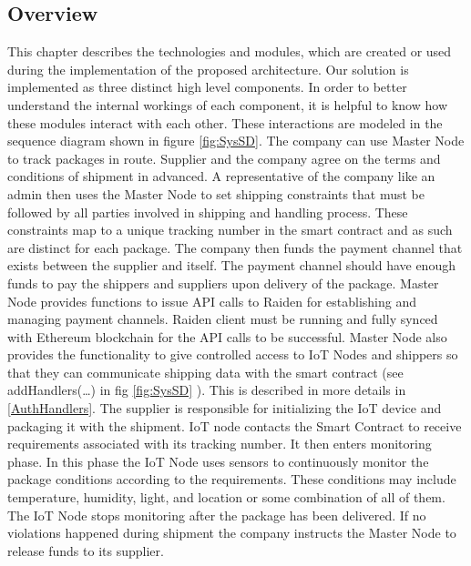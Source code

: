 \subsection{Overview}
This chapter describes the technologies and modules, which are created or used during the implementation of the proposed architecture. Our solution is implemented as three distinct high level components. In order to better understand the internal workings of each component, it is helpful to know how these modules interact with each other.  These interactions are modeled in the sequence diagram shown in figure \ref{fig:SysSD}.  The company can use Master Node to track packages in route. Supplier and the company agree on the terms and conditions of shipment in advanced. A representative of the company like an admin then uses the Master Node to set shipping constraints that must be followed by all parties involved in shipping and handling process. These constraints map to a unique tracking number in the smart contract and as such are distinct for each package.  The company then funds the payment channel that exists between the supplier and itself. The payment channel should have enough funds to pay the shippers and suppliers upon delivery of the package. Master Node provides functions to issue API calls to Raiden for establishing and managing payment channels. Raiden client must be running and fully synced with Ethereum blockchain for the API calls to be successful. Master Node also provides the functionality to give controlled access to IoT Nodes and shippers so that they can communicate shipping data with the smart contract (see addHandlers(…) in fig \ref{fig:SysSD} ). This is described in more details in \ref{AuthHandlers}. The supplier is responsible for initializing the IoT device and packaging it with the shipment. IoT node contacts the Smart Contract to receive requirements associated with its tracking number. It then enters monitoring phase. In this phase the IoT Node uses sensors to continuously monitor the package conditions according to the requirements. These conditions may include temperature, humidity, light, and location or some combination of all of them. The IoT Node stops monitoring after the package has been delivered. If no violations happened during shipment the company instructs the Master Node to release funds to its supplier.

